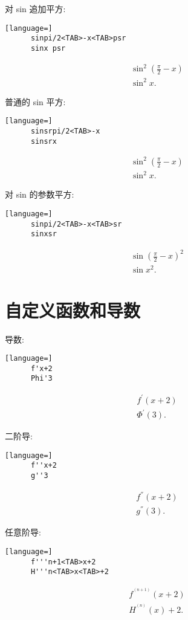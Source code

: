 \documentclass[UTF8,a4paper,11pt]{ctexart}
\begin{document}
    对 sin 追加平方: 
    \begin{lstlisting}[language=] 
      sinpi/2<TAB>-x<TAB>psr
      sinx psr\end{lstlisting}
    \[
    \begin{aligned}
      \sin^2\left(\frac{\pi}{2}-x\right)
      \\ \sin^2 x 
    .\end{aligned}
    \]
    
    普通的 sin 平方: 
    \begin{lstlisting}[language=] 
      sinsrpi/2<TAB>-x
      sinsrx\end{lstlisting}
    \[
    \begin{aligned}
      \sin^{2}\left(\frac{\pi}{2}-x\right)
      \\ \sin ^{2}x
    .\end{aligned}
    \]
    
    对 sin 的参数平方: 
    \begin{lstlisting}[language=] 
      sinpi/2<TAB>-x<TAB>sr
      sinxsr\end{lstlisting}
    \[
    \begin{aligned}
      \sin\left(\frac{\pi}{2}-x\right)^{2}
      \\ \sin x^{2}
    .\end{aligned}
    \]
    
  \section{自定义函数和导数}
    导数: 
    \begin{lstlisting}[language=] 
      f'x+2
      Phi'3\end{lstlisting}
    \[
    \begin{aligned}
      f^{'}\left(x+2\right)
      \\ \Phi^{'}\left(3\right)
    .\end{aligned}
    \]
    
    二阶导: 
    \begin{lstlisting}[language=] 
      f''x+2
      g''3\end{lstlisting}
    \[
    \begin{aligned}
      f^{''}\left(x+2\right)
      \\ g^{''}\left(3\right)
    .\end{aligned}
    \]
    
    任意阶导: 
    \begin{lstlisting}[language=] 
      f'''n+1<TAB>x+2
      H'''n<TAB>x<TAB>+2\end{lstlisting}
    \[
    \begin{aligned}
      f^{^{(n+1)}}\left(x+2\right)\\
      H^{^{(n)}}\left(x\right)+2
    .\end{aligned}
    \]
    
\end{document}
